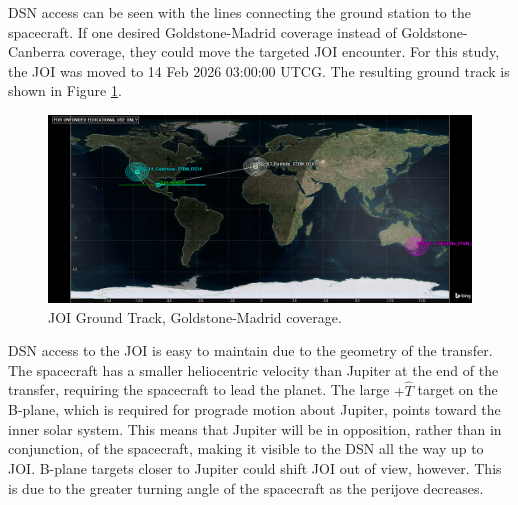 \documentclass[]{aiaa-tc}%
\begin{document}
DSN access can be seen with the lines connecting the ground station to the spacecraft. If one desired Goldstone-Madrid coverage instead of Goldstone-Canberra coverage, they could move the targeted JOI encounter. For this study, the JOI was moved to 14 Feb 2026 03:00:00 UTCG. The resulting ground track is shown in Figure \ref{fig:newJOI_GroundTrack}.
	\begin{figure}[H]
		\centering
			\includegraphics[width = 16cm]{../Figures/newJOI_GroundTrack.png}
		\caption{JOI Ground Track, Goldstone-Madrid coverage. }
		\label{fig:newJOI_GroundTrack}
	\end{figure}	

DSN access to the JOI is easy to maintain due to the geometry of the transfer. The spacecraft has a smaller heliocentric velocity than Jupiter at the end of the transfer, requiring the spacecraft to lead the planet. The large $+\hat{T}$ target on the B-plane, which is required for prograde motion about Jupiter, points toward the inner solar system. This means that Jupiter will be in opposition, rather than in conjunction, of the spacecraft, making it visible to the DSN all the way up to JOI.  B-plane targets closer to Jupiter could shift JOI out of view, however. This is due to the greater turning angle of the spacecraft as the perijove decreases.
\end{document}
